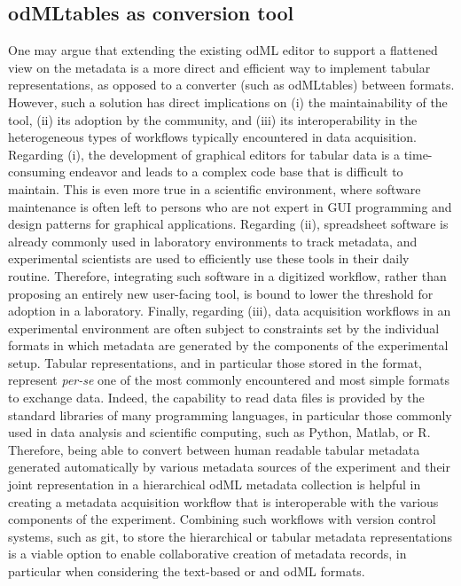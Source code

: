 {\subsection{odMLtables as conversion tool}
One may argue that extending the existing odML editor to support a flattened view on the metadata is a more direct and efficient way to implement tabular representations, as opposed to a converter (such as odMLtables) between formats. However, such a solution has direct implications on (i) the maintainability of the tool, (ii) its adoption by the community, and (iii) its interoperability in the heterogeneous types of workflows typically encountered in data acquisition. Regarding (i), the development of graphical editors for tabular data  is a time-consuming endeavor and leads to a complex code base that is difficult to maintain. This is even more true in a scientific environment, where software maintenance is often left to persons who are not expert in GUI programming and design patterns for graphical applications. Regarding (ii), spreadsheet software is already commonly used in laboratory environments to track metadata, and experimental scientists are used to efficiently use these tools in their daily routine. Therefore, integrating such software in a digitized workflow, rather than proposing an entirely new user-facing tool, is bound to lower the threshold for adoption in a laboratory. Finally, regarding (iii), data acquisition workflows in an experimental environment are often subject to constraints set by the individual formats in which metadata are generated by the components of the experimental setup. Tabular representations, and in particular those stored in the  format, represent \textit{per-se} one of the most commonly encountered and most simple formats to exchange data. Indeed, the capability to read  data files is provided by the standard libraries of many programming languages, in particular those commonly used in data analysis and scientific computing, such as Python, Matlab, or R. Therefore, being able to convert between human readable tabular metadata generated automatically by various metadata sources of the experiment and their joint representation in a hierarchical odML metadata collection is helpful in creating a metadata acquisition workflow that is interoperable with the various components of the experiment. Combining such workflows with version control systems, such as git, to store the hierarchical or tabular metadata representations is a viable option to enable collaborative creation of metadata records, in particular when considering the text-based  or and odML formats.

}
